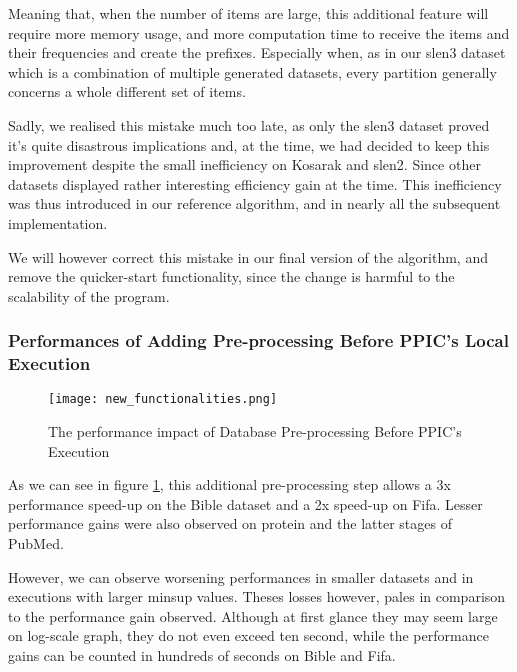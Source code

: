 \documentclass{eplmastersthesis}
\begin{document}
Meaning that, when the number of items are large, this additional feature will require more memory usage, and more computation time to receive the items and their frequencies and create the prefixes. Especially when, as in our slen3 dataset which is a combination of multiple generated datasets, every partition generally concerns a whole different set of items.\newline

Sadly, we realised this mistake much too late, as only the slen3 dataset proved it's quite disastrous implications and, at the time, we had decided to keep this improvement despite the small inefficiency on Kosarak and slen2. Since other datasets displayed rather interesting efficiency gain at the time. This inefficiency was thus introduced in our reference algorithm, and in nearly all the subsequent implementation. \newline

We will however correct this mistake in our final version of the algorithm, and remove the quicker-start functionality, since the change is harmful to the scalability of the program.

\subsubsection{Performances of Adding Pre-processing Before PPIC's Local Execution}

\begin{figure}[h]
  \centering
  \texttt{[image: new\_functionalities.png]}
  \caption{The performance impact of Database Pre-processing Before PPIC's Execution}
  \label{fig:clean_before_PPIC}
\end{figure}

As we can see in figure \ref{fig:clean_before_PPIC}, this additional pre-processing step allows a 3x performance speed-up on the Bible dataset and a 2x speed-up on Fifa. Lesser performance gains were also observed on protein and the latter stages of PubMed. \newline

However, we can observe worsening performances in smaller datasets and in executions with larger minsup values. Theses losses however, pales in comparison to the performance gain observed. Although at first glance they may seem large on log-scale graph, they do not even exceed ten second, while the performance gains can be counted in hundreds of seconds on Bible and Fifa. \newline
\end{document}

